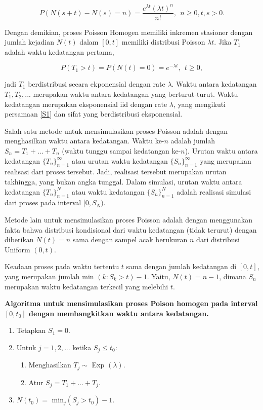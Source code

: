 \documentclass[a4paper,12pt]{article}
\theoremstyle{definition}
\begin{document}
\begin{equation} \label{S1}
    P(N(s+t)-N(s) = n) = \frac{e^{\lambda t} (\lambda t)^n}{n!},\ \ n \geq 0, t, s > 0.
\end{equation}

Dengan demikian, proses Poisson Homogen memiliki inkremen stasioner dengan jumlah kejadian $N(t)$ dalam $[0, t]$ memiliki distribusi Poisson $\lambda t$. Jika $T_1$ adalah waktu kedatangan pertama, 

\begin{equation*}
    P(T_1 > t) = P(N(t) = 0) = e^{- \lambda t}, \ \ t \geq 0,
\end{equation*}

jadi $T_1$ berdistribusi secara ekponensial dengan rate $\lambda$. Waktu antara kedatangan $T_1, T_2, ...$ merupakan waktu antara kedatangan yang berturut-turut. Waktu kedatangan merupakan eksponensial iid dengan rate $\lambda$, yang mengikuti persamaan \ref{S1} dan sifat yang berdistribusi eksponensial.

Salah satu metode untuk mensimulasikan proses Poisson adalah dengan menghasilkan waktu antara kedatangan. Waktu ke-$n$ adalah jumlah $S_n = T_1 + ... + T_n$ (waktu tunggu sampai kedatangan ke-$n$). Urutan waktu antara kedatangan $\{ T_n \}^\infty _{n=1}$ atau urutan waktu kedatangan $\{ S_n \}^\infty _{n=1}$ yang merupakan realisasi dari proses tersebut. Jadi, realisasi tersebut merupakan urutan takhingga, yang bukan angka tunggal. Dalam simulasi, urutan waktu antara kedatangan $\{T_n\}^N _{n=1}$ atau waktu kedatangan $\{S_n\}^N _{n=1}$ adalah realisasi simulasi dari proses pada interval $[0, S_N)$.

Metode lain untuk mensimulasikan proses Poisson adalah dengan menggunakan fakta bahwa distribusi kondisional dari waktu kedatangan (tidak terurut) dengan diberikan $N(t)=n$ sama dengan sampel acak berukuran $n$ dari distribusi Uniform $(0, t)$. 

Keadaan proses pada waktu tertentu $t$ sama dengan jumlah kedatangan di $[0, t]$, yang merupakan jumlah min $(k : S_k > t) - 1$. Yaitu, $N(t) = n - 1$, dimana $S_n$ merupakan waktu kedatangan terkecil yang melebihi $t$.

\textbf{Algoritma untuk mensimulasikan proses Poison homogen pada interval $[0, t_0]$ dengan membangkitkan waktu antara kedatangan.} 
\begin{enumerate}
    \item Tetapkan $S_1 = 0$.
    \item Untuk $j = 1, 2, ...$ ketika $S_j \leq t_0$:
        \begin{enumerate}
            \item Menghasilkan $T_j \sim$ Exp $(\lambda)$.
            \item Atur $S_j = T_1 + ... + T_j$.
        \end{enumerate}
    \item $N(t_0) =$ min$_j(S_j > t_0) - 1$. 
\end{enumerate}
\end{document}

